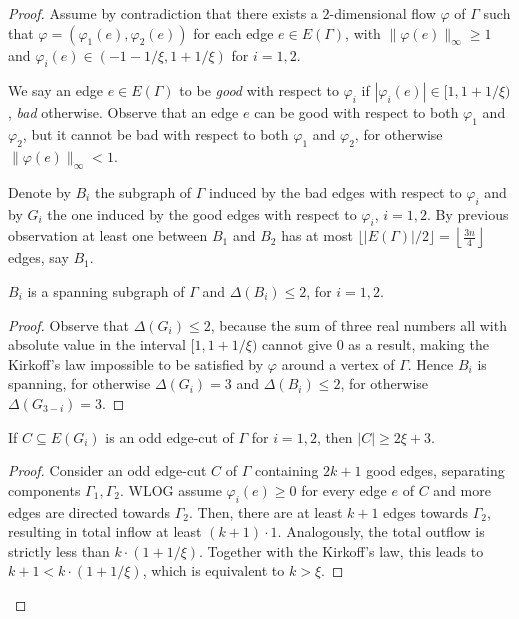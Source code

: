 \begin{proof}
    Assume by contradiction that there exists a $2$-dimensional flow $\varphi$ of $\Gamma$ such that $\varphi = (\varphi_1(e), \varphi_2(e))$ for each edge $e \in E(\Gamma)$, with $\|\varphi(e)\|_\infty\geq 1$ and $\varphi_i(e) \in (-1-1/\xi, 1+1/\xi)$ for $i = 1, 2$.

    We say an edge $e \in E(\Gamma)$ to be \emph{good} with respect to $\varphi_i$ if $|\varphi_i(e)| \in [1, 1+1/\xi)$, \emph{bad} otherwise. Observe that an edge $e$ can be good with respect to both $\varphi_1$ and $\varphi_2$, but it cannot be bad with respect to both $\varphi_1$ and $\varphi_2$, for otherwise $\|\varphi(e)\|_\infty<1$.

    Denote by $B_i$ the subgraph of $\Gamma$ induced by the bad edges with respect to $\varphi_i$ and by $G_i$ the one induced by the good edges with respect to $\varphi_i$, $i = 1, 2$. By previous observation at least one between $B_1$ and $B_2$ has at most $\lfloor|E(\Gamma)|/2\rfloor=\left\lfloor\frac{3n}4\right\rfloor$ edges, say $B_1$.

    \begin{claim}
        $B_i$ is a spanning subgraph of $\Gamma$ and $\Delta(B_i) \leq 2$, for $i = 1, 2$.
    \end{claim}
    \begin{proof}
        Observe that $\Delta(G_i) \leq 2$, because the sum of three real numbers all with absolute value in the interval $[1, 1+1/\xi)$ cannot give $0$ as a result, making the Kirkoff's law impossible to be satisfied by $\varphi$ around a vertex of $\Gamma$. Hence $B_i$ is spanning, for otherwise $\Delta(G_i) = 3$ and $\Delta(B_i) \leq 2$, for otherwise $\Delta(G_{3-i}) = 3$.
    \end{proof}

    \begin{claim}
        If $C\subseteq E(G_i)$ is an odd edge-cut of $\Gamma$ for $i=1, 2$, then $|C|\geq 2\xi+3$.
    \end{claim}
    \begin{proof}
        Consider an odd edge-cut $C$ of $\Gamma$ containing $2k+1$ good edges, separating components $\Gamma_1, \Gamma_2$. WLOG assume $\varphi_i(e)\geq0$ for every edge $e$ of $C$ and more edges are directed towards $\Gamma_2$. Then, there are at least $k+1$ edges towards $\Gamma_2$, resulting in total inflow at least $(k+1)\cdot1$. Analogously, the total outflow is strictly less than $k\cdot(1+1/\xi)$. Together with the Kirkoff's law, this leads to $k+1<k\cdot(1+1/\xi)$, which is equivalent to $k>\xi$.
    \end{proof}


\end{proof}

